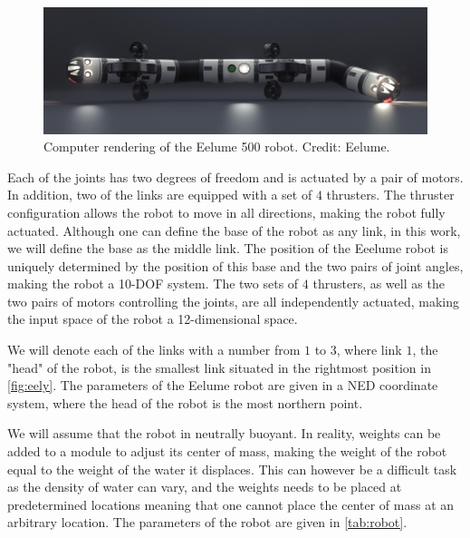 \begin{figure}[h!]
    \centering
    \includegraphics[width=0.8\linewidth]{assets/images/eely.jpg}
    \caption{Computer rendering of the Eelume 500 robot. Credit: Eelume.}
    \label{fig:eely}
\end{figure}

Each of the joints has two degrees of freedom and is actuated by a pair of
motors. In addition, two of the links are equipped with a set of $4$ thrusters.
The thruster configuration allows the robot to move in all directions, making
the robot fully actuated. Although one can define the base of the robot as any
link, in this work, we will define the base as the middle link. The position of
the Eeelume robot is uniquely determined by the position of this base and the 
two pairs of joint angles, making the robot a 10-DOF system. The two sets of 
$4$ thrusters, as well as the two pairs of motors controlling the joints, are 
all independently actuated, making the input space of the robot a 
12-dimensional space.

We will denote each of the links with a number from $1$ to $3$, where link $1$,
the "head" of the robot, is the smallest link situated in the rightmost position
in \autoref{fig:eely}. The parameters of the Eelume robot are given in a
NED coordinate system, where the head of the robot is the most northern point.

We will assume that the robot in neutrally buoyant. In reality, weights can be
added to a module to adjust its center of mass, making the weight of the robot
equal to the weight of the water it displaces. This can however be a difficult
task as the density of water can vary, and the weights needs to be placed at 
predetermined locations meaning that one cannot place the center of mass at an
arbitrary location.
The parameters of the robot are given in \autoref{tab:robot}.


